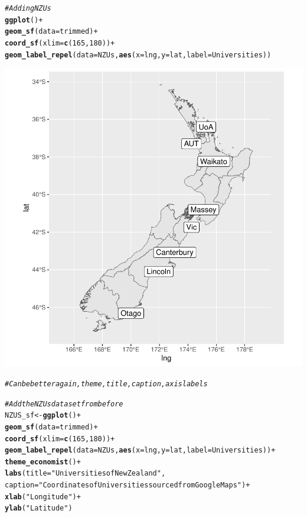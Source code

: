 \documentclass{article}\usepackage[]{graphicx}\usepackage[]{xcolor}
\makeatletter
\newcommand{\hlnum}[1]{\textcolor[rgb]{0.686,0.059,0.569}{#1}}%
\newcommand{\hlstr}[1]{\textcolor[rgb]{0.192,0.494,0.8}{#1}}%
\newcommand{\hlcom}[1]{\textcolor[rgb]{0.678,0.584,0.686}{\textit{#1}}}%
\newcommand{\hlopt}[1]{\textcolor[rgb]{0,0,0}{#1}}%
\newcommand{\hlstd}[1]{\textcolor[rgb]{0.345,0.345,0.345}{#1}}%
\newcommand{\hlkwb}[1]{\textcolor[rgb]{0.69,0.353,0.396}{#1}}%
\newcommand{\hlkwc}[1]{\textcolor[rgb]{0.333,0.667,0.333}{#1}}%
\newcommand{\hlkwd}[1]{\textcolor[rgb]{0.737,0.353,0.396}{\textbf{#1}}}%
\newenvironment{kframe}{%
 \def\at@end@of@kframe{}%
 \ifinner\ifhmode%
  \def\at@end@of@kframe{\end{minipage}}%
  \begin{minipage}{\columnwidth}%
 \fi\fi%
 \def\FrameCommand##1{\hskip\@totalleftmargin \hskip-\fboxsep
 \colorbox{shadecolor}{##1}\hskip-\fboxsep
     \hskip-\linewidth \hskip-\@totalleftmargin \hskip\columnwidth}%
 \MakeFramed {\advance\hsize-\width
   \@totalleftmargin\z@ \linewidth\hsize
   \@setminipage}}%
 {\par\unskip\endMakeFramed%
 \at@end@of@kframe}
\newenvironment{knitrout}{}{} %
\makeatother
\begin{document}
\begin{knitrout}
{}


\begin{kframe}\begin{alltt}
\hlcom{# Adding NZUs}
\hlkwd{ggplot}\hlstd{()} \hlopt{+}
  \hlkwd{geom_sf}\hlstd{(}\hlkwc{data} \hlstd{= trimmed)} \hlopt{+}
  \hlkwd{coord_sf}\hlstd{(}\hlkwc{xlim} \hlstd{=} \hlkwd{c}\hlstd{(}\hlnum{165}\hlstd{,} \hlnum{180}\hlstd{))} \hlopt{+}
  \hlkwd{geom_label_repel}\hlstd{(}\hlkwc{data} \hlstd{= NZUs,} \hlkwd{aes}\hlstd{(}\hlkwc{x} \hlstd{= lng,} \hlkwc{y} \hlstd{= lat,} \hlkwc{label} \hlstd{= Universities))}
\end{alltt}
\end{kframe}

{\centering \includegraphics[width=.6\linewidth]{figure/introduction-to-R-for-economists-Rnwauto-report-6} 

}


\begin{kframe}\begin{alltt}
\hlcom{# Can be better again, theme, title, caption, axis labels}

\hlcom{# Add the NZUs dataset from before}
\hlstd{NZUS_sf} \hlkwb{<-} \hlkwd{ggplot}\hlstd{()} \hlopt{+}
  \hlkwd{geom_sf}\hlstd{(}\hlkwc{data} \hlstd{= trimmed)} \hlopt{+}
  \hlkwd{coord_sf}\hlstd{(}\hlkwc{xlim} \hlstd{=} \hlkwd{c}\hlstd{(}\hlnum{165}\hlstd{,} \hlnum{180}\hlstd{))} \hlopt{+}
  \hlkwd{geom_label_repel}\hlstd{(}\hlkwc{data} \hlstd{= NZUs,} \hlkwd{aes}\hlstd{(}\hlkwc{x} \hlstd{= lng,} \hlkwc{y} \hlstd{= lat,} \hlkwc{label} \hlstd{= Universities))} \hlopt{+}
  \hlkwd{theme_economist}\hlstd{()} \hlopt{+}
  \hlkwd{labs} \hlstd{(}\hlkwc{title} \hlstd{=} \hlstr{"Universities of New Zealand"}\hlstd{,}
       \hlkwc{caption} \hlstd{=} \hlstr{"Coordinates of Universities sourced from GoogleMaps"}\hlstd{)} \hlopt{+}
  \hlkwd{xlab}\hlstd{(}\hlstr{"Longitude"}\hlstd{)} \hlopt{+}
  \hlkwd{ylab}\hlstd{(}\hlstr{"Latitude"}\hlstd{)}
\end{alltt}
\end{kframe}
\end{knitrout}
\end{document}
